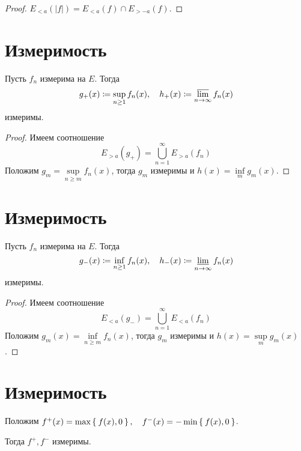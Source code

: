 \begin{proof}
	$ E_{<a}(|f|) = E_{<a}(f) \cap E_{>-a}(f) $.
\end{proof}

\section{Измеримость }

\begin{property}\label{prop:meas_prop:2}
	Пусть $ f_n $ измерима на $ E $. Тогда
	$$ g_+(x) \coloneq \sup\limits_{n \ge 1} f_n(x), \quad h_+(x) \coloneq \varlimsup\limits_{n \to \infty} f_n(x) $$
	измеримы.
\end{property}

\begin{proof}
	Имеем соотношение
	$$ E_{>a}(g_+) = \bigcup_{n = 1}^\infty E_{>a}(f_n) $$
	Положим $ g_m = \sup\limits_{n \ge m} f_n(x) $, тогда $ g_m $ измеримы и $ h(x) = \inf\limits_m g_m(x) $.
\end{proof}

\section{Измеримость }

\begin{property}
	Пусть $ f_n $ измерима на $ E $. Тогда
	$$ g_-(x) \coloneq \inf\limits_{n \ge 1} f_n(x), \quad h_-(x) \coloneq \varliminf_{n \to \infty} f_n(x) $$
	измеримы.
\end{property}

\begin{proof}
	Имеем соотношение
	$$ E_{<a}(g_-) = \bigcup_{n = 1}^\infty E_{<a}(f_n) $$
	Положим $ g_m(x) = \inf\limits_{n \ge m} f_n(x) $, тогда $ g_m $ измеримы и $ h(x) = \sup\limits_m g_m(x) $.
\end{proof}

\section{Измеримость }

\begin{property}
	Положим $ f^+(x) = \max \Set{f(x), 0}, \quad f^-(x) = -\min \Set{f(x), 0} $.

	Тогда $ f^+, f^- $ измеримы.
\end{property}

